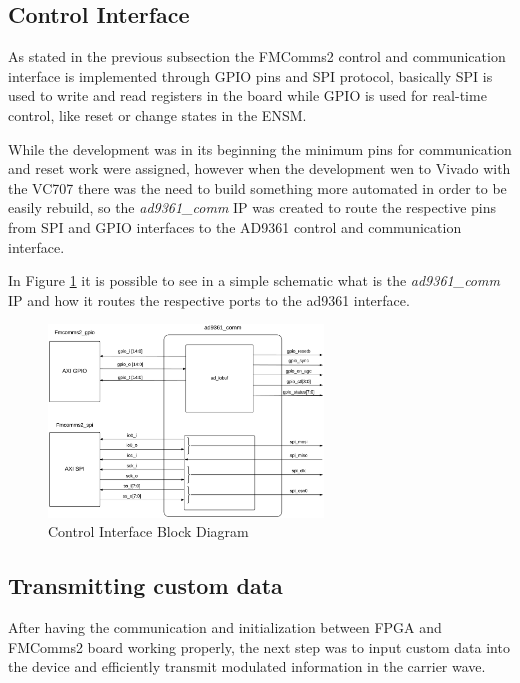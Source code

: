 \subsection{Control Interface}
\label{subs:controlif}

As stated in the previous subsection the FMComms2 control and communication
interface is implemented through GPIO pins and SPI protocol, basically SPI is
used to write and read registers in the board while GPIO is used for real-time
control, like reset or change states in the ENSM.

While the development was in its beginning the minimum pins for communication
and reset work were assigned, however when the development wen to Vivado with
the VC707 there was the need to build something more automated in order to be
easily rebuild, so the \emph{ad9361\_comm} IP was created to route the respective
pins from SPI and GPIO interfaces to the AD9361 control and communication interface.

In Figure \ref{fig:commif} it is possible to see in a simple schematic what is
the \emph{ad9361\_comm} IP and how it routes the respective ports to the ad9361
interface.

\begin{figure}[htbp]
    \centering
    \includegraphics[width=0.65\textwidth]{./figures/comm_if}
    \caption{ Control Interface Block Diagram
    \label{fig:commif}}
\end{figure}

\subsection{Transmitting custom data}

After having the communication and initialization between FPGA and FMComms2
board working properly, the next step was to input custom data into the device
and efficiently transmit modulated information in the carrier wave.

